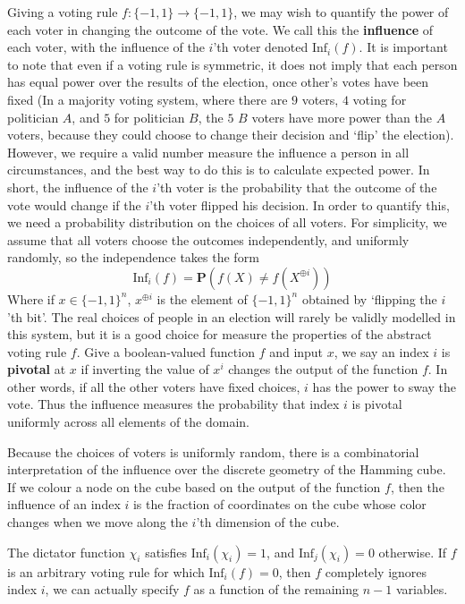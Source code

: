Giving a voting rule $f: \{ -1, 1 \} \to \{ -1, 1 \}$, we may wish to quantify the power of each voter in changing the outcome of the vote. We call this the {\bf influence} of each voter, with the influence of the $i$'th voter denoted $\text{Inf}_i(f)$. It is important to note that even if a voting rule is symmetric, it does not imply that each person has equal power over the results of the election, once other's votes have been fixed (In a majority voting system, where there are $9$ voters, $4$ voting for politician $A$, and $5$ for politician $B$, the $5$ $B$ voters have more power than the $A$ voters, because they could choose to change their decision and `flip' the election). However, we require a valid number measure the influence a person in all circumstances, and the best way to do this is to calculate expected power. In short, the influence of the $i$'th voter is the probability that the outcome of the vote would change if the $i$'th voter flipped his decision. In order to quantify this, we need a probability distribution on the choices of all voters. For simplicity, we assume that all voters choose the outcomes independently, and uniformly randomly, so the independence takes the form
%
\[ \text{Inf}_i(f) = \mathbf{P}(f(X) \neq f(X^{\oplus i})) \]
%
Where if $x \in \{ -1, 1 \}^n$, $x^{\oplus i}$ is the element of $\{ -1, 1 \}^n$ obtained by `flipping the $i$'th bit'. The real choices of people in an election will rarely be validly modelled in this system, but it is a good choice for measure the properties of the abstract voting rule $f$. Give a boolean-valued function $f$ and input $x$, we say an index $i$ is {\bf pivotal} at $x$ if inverting the value of $x^i$ changes the output of the function $f$. In other words, if all the other voters have fixed choices, $i$ has the power to sway the vote. Thus the influence measures the probability that index $i$ is pivotal uniformly across all elements of the domain.

Because the choices of voters is uniformly random, there is a combinatorial interpretation of the influence over the discrete geometry of the Hamming cube. If we colour a node on the cube based on the output of the function $f$, then the influence of an index $i$ is the fraction of coordinates on the cube whose color changes when we move along the $i$'th dimension of the cube.

\begin{example}
    The dictator function $\chi_i$ satisfies $\text{Inf}_i(\chi_i) = 1$, and $\text{Inf}_j(\chi_i) = 0$ otherwise. If $f$ is an arbitrary voting rule for which $\text{Inf}_i(f) = 0$, then $f$ completely ignores index $i$, we can actually specify $f$ as a function of the remaining $n-1$ variables.
\end{example}

